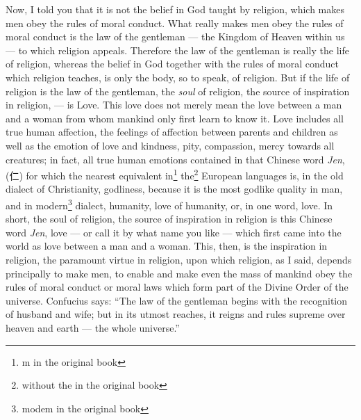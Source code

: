 \vspace{0.5cm}
Now, I told you that it is not the belief in God taught by religion, which makes men obey the rules of moral conduct.
What really makes men obey the rules of moral conduct is the law of the gentleman --- the Kingdom of Heaven within us --- to which religion appeals.
Therefore the law of the gentleman is really the life of religion, whereas the belief in God together with the rules of moral conduct which religion teaches, is only the body, so to speak, of religion.
But if the life of religion is the law of the gentleman, the \emph{soul} of religion, the source of inspiration in religion, --- is Love.
This love does not merely mean the love between a man and a woman from whom mankind only first learn to know it.
Love includes all true human affection, the feelings of affection between parents and children as well as the emotion of love and kindness, pity, compassion, mercy towards all creatures; in fact, all true human emotions contained in that Chinese word \emph{Jen}, (仁) for which the nearest equivalent in\footnote{m in the original book} the\footnote{without the in the original book} European languages is, in the old dialect of Christianity, godliness, because it is the most godlike quality in man, and in modern\footnote{modem in the original book} dialect, humanity, love of humanity, or, in one word, love.
In short, the soul of religion, the source of inspiration in religion is this Chinese word \emph{Jen}, love --- or call it by what name you like --- which first came into the world as love between a man and a woman.
This, then, is the inspiration in religion, the paramount virtue in religion, upon which religion, as I said, depends principally to make men, to enable and make even the mass of mankind obey the rules of moral conduct or moral laws which form part of the Divine Order of the universe.
Confucius says: ``The law of the gentleman begins with the recognition of husband and wife; but in its utmost reaches, it reigns and rules supreme over heaven and earth --- the whole universe.''

